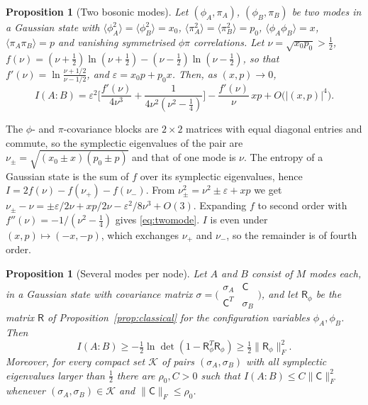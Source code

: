 \documentclass[11pt,a4paper]{article}
\makeatletter
\theoremstyle{stmt}
\newtheorem{proposition}[theorem]{Proposition}
\theoremstyle{defn}
\theoremstyle{rmk}
\renewenvironment{proof}[1][\proofname]{\par\pushQED{\qed}\normalfont\topsep6\p@\@plus6\p@\relax
  \trivlist\item[\hskip\labelsep{\sffamily\itshape\small #1.}]\ignorespaces}{\popQED\endtrivlist\@endpefalse}
\numberwithin{equation}{section}
\makeatother
\begin{document}
\begin{proposition}[Two bosonic modes]\label{prop:twomode}
Let $(\phi_A,\pi_A)$, $(\phi_B,\pi_B)$ be two modes in a Gaussian state with $\langle\phi_A^2\rangle=\langle\phi_B^2\rangle=x_0$, $\langle\pi_A^2\rangle=\langle\pi_B^2\rangle=p_0$, $\langle\phi_A\phi_B\rangle=x$, $\langle\pi_A\pi_B\rangle=p$ and vanishing symmetrised $\phi\pi$ correlations. Let $\nu=\sqrt{x_0p_0}>\tfrac12$, $f(\nu)=(\nu+\tfrac12)\ln(\nu+\tfrac12)-(\nu-\tfrac12)\ln(\nu-\tfrac12)$, so that $f'(\nu)=\ln\frac{\nu+1/2}{\nu-1/2}$, and $\varepsilon=x_0p+p_0x$. Then, as $(x,p)\to0$,
\begin{equation}\label{eq:twomode}
I(A:B)=\varepsilon^2\Big[\frac{f'(\nu)}{4\nu^3}+\frac{1}{4\nu^2(\nu^2-\tfrac14)}\Big]-\frac{f'(\nu)}{\nu}\,xp+O\big(|(x,p)|^4\big).
\end{equation}
\end{proposition}

\begin{proof}
The $\phi$- and $\pi$-covariance blocks are $2\times2$ matrices with equal diagonal entries and commute, so the symplectic eigenvalues of the pair are $\nu_\pm=\sqrt{(x_0\pm x)(p_0\pm p)}$ and that of one mode is $\nu$. The entropy of a Gaussian state is the sum of $f$ over its symplectic eigenvalues, hence $I=2f(\nu)-f(\nu_+)-f(\nu_-)$. From $\nu_\pm^2=\nu^2\pm\varepsilon+xp$ we get $\nu_\pm-\nu=\pm\varepsilon/2\nu+xp/2\nu-\varepsilon^2/8\nu^3+O(3)$. Expanding $f$ to second order with $f''(\nu)=-1/(\nu^2-\tfrac14)$ gives \eqref{eq:twomode}. $I$ is even under $(x,p)\mapsto(-x,-p)$, which exchanges $\nu_+$ and $\nu_-$, so the remainder is of fourth order.
\end{proof}

\begin{proposition}[Several modes per node]\label{prop:multimode}
Let $A$ and $B$ consist of $M$ modes each, in a Gaussian state with covariance matrix $\sigma=\big(\begin{smallmatrix}\sigma_A&\mathsf C\\ \mathsf C^{T}&\sigma_B\end{smallmatrix}\big)$, and let $\mathsf R_\phi$ be the matrix $\mathsf R$ of Proposition~\ref{prop:classical} for the configuration variables $\phi_A,\phi_B$. Then
\begin{equation}
I(A:B)\ge-\tfrac12\ln\det(1-\mathsf R_\phi^{T}\mathsf R_\phi)\ge\tfrac12\|\mathsf R_\phi\|_F^2 .
\end{equation}
Moreover, for every compact set $\mathcal K$ of pairs $(\sigma_A,\sigma_B)$ with all symplectic eigenvalues larger than $\tfrac12$ there are $\rho_0,C>0$ such that $I(A:B)\le C\|\mathsf C\|_F^2$ whenever $(\sigma_A,\sigma_B)\in\mathcal K$ and $\|\mathsf C\|_F\le\rho_0$.
\end{proposition}
\end{document}
